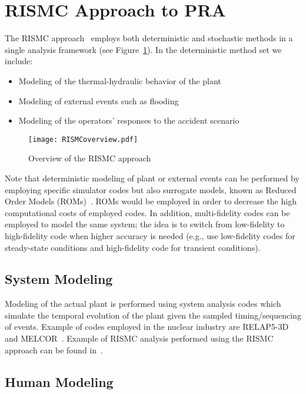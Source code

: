 \section{RISMC Approach to PRA}
\label{sec:rismc}
The RISMC approach~\cite{RISMC} employs both deterministic and stochastic methods 
in a single analysis framework (see Figure~\ref{fig:RISMCoverview}). In the deterministic method 
set we include:
\begin{itemize}
  \item Modeling of the thermal-hydraulic behavior of the plant~\cite{BWR_SBO_Mandelli,BWRanalysis}
  \item Modeling of external events such as flooding~\cite{mandelliPSA2015}
  \item Modeling of the operators’ responses to the accident scenario~\cite{HRA_BoringReport2014}
\end{itemize}

\begin{figure}
    \centering
    \centerline{\texttt{[image: RISMCoverview.pdf]}}
    \caption{Overview of the RISMC approach}
    \label{fig:RISMCoverview}
\end{figure}

Note that deterministic modeling of plant or external events can be performed by employing 
specific simulator codes but also surrogate models, known as Reduced Order Models (ROMs)~\cite{ROM_Khalik}. 
ROMs would be employed in order to decrease the high computational costs of employed codes.
In addition, multi-fidelity codes can be employed to model the same system; the idea is to 
switch from low-fidelity to high-fidelity code when higher accuracy is needed (e.g., use 
low-fidelity codes for steady-state conditions and high-fidelity code for transient conditions).

\subsection{System Modeling}

Modeling of the actual plant is performed using system analysis codes which simulate the temporal 
evolution of the plant given the sampled timing/sequencing of events. Example of codes employed 
in the nuclear industry are RELAP5-3D~\cite{relap5} and MELCOR~\cite{Melcor}. 
Example of RISMC analysis performed using the RISMC approach can be 
found in~\cite{BWR_SBO_Mandelli,BWRanalysis,PRA_comparison_PSA2015}.

\subsection{Human Modeling}


